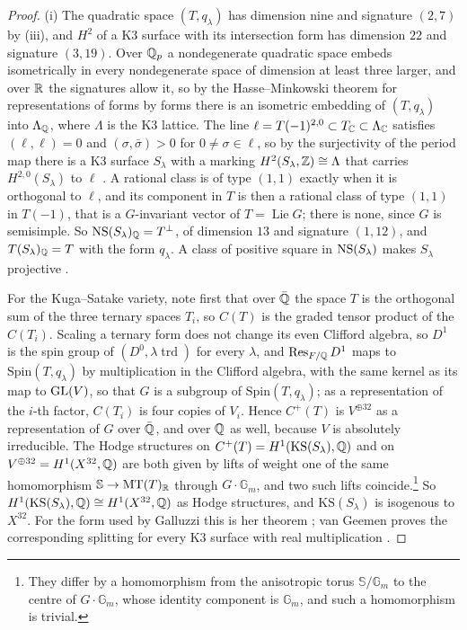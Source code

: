 \begin{proof}
(i) The quadratic space $(T,q_{\lambda})$ has dimension nine and signature
$(2,7)$ by (iii), and $H^{2}$ of a K3 surface with its
intersection form has dimension $22$ and signature $(3,19)$. Over $\mathbb{Q}_{p}$
a nondegenerate quadratic space embeds isometrically in every nondegenerate
space of dimension at least three larger, and over $\mathbb{R}$ the signatures
allow it, so by the Hasse--Minkowski theorem for representations of forms by
forms \cite[\S\S63, 66]{OMe00} there is an isometric embedding of
$(T,q_{\lambda})$ into $\Lambda_{\mathbb{Q}}$, where $\Lambda$ is the K3 lattice.
The line $\ell=T(-1)^{2,0}\subset T_{\mathbb{C}}\subset\Lambda_{\mathbb{C}}$ satisfies
$(\ell,\ell)=0$ and $(\sigma,\bar{\sigma})>0$ for $0\ne\sigma\in\ell$, so by the
surjectivity of the period map there is a K3 surface $S_{\lambda}$ with a
marking $H^{2}(S_{\lambda},\mathbb{Z})\cong\Lambda$ that carries
$H^{2,0}(S_{\lambda})$ to $\ell$ \cite[Chs.~6--7]{Huy16}. A rational class
is of type $(1,1)$ exactly when it is orthogonal to $\ell$, and its component
in $T$ is then a rational class of type $(1,1)$ in $T(-1)$, that is a
$G$-invariant vector of $T=\operatorname{Lie}G$; there is none, since $G$ is
semisimple. So $\mathrm{NS}(S_{\lambda})_{\mathbb{Q}}=T^{\perp}$, of dimension $13$ and
signature $(1,12)$, and $T(S_{\lambda})_{\mathbb{Q}}=T$ with the form $q_{\lambda}$.
A class of positive square in $\mathrm{NS}(S_{\lambda})$ makes $S_{\lambda}$
projective \cite[Ch.~8]{Huy16}.

For the Kuga--Satake variety, note first that over $\bar{\mathbb{Q}}$ the space $T$
is the orthogonal sum of the three ternary spaces $T_{i}$, so $C(T)$ is the
graded tensor product of the $C(T_{i})$. Scaling a ternary form does not
change its even Clifford algebra, so $D^{1}$ is the spin group of
$(D^{0},\lambda\operatorname{trd})$ for every $\lambda$, and
$\operatorname{Res}_{F/\mathbb{Q}}D^{1}$ maps to $\mathrm{Spin}(T,q_{\lambda})$ by multiplication
in the Clifford algebra, with the same kernel as its map to $\operatorname{GL}(V)$, so that
$G$ is a subgroup of $\mathrm{Spin}(T,q_{\lambda})$; as a representation of
the $i$-th factor, $C(T_{i})$ is four copies of $V_{i}$. Hence $C^{+}(T)$ is
$V^{\oplus32}$ as a representation of $G$ over $\bar{\mathbb{Q}}$, and over $\mathbb{Q}$ as
well, because $V$ is absolutely irreducible. The Hodge structures on
$C^{+}(T)=H^{1}(\mathrm{KS}(S_{\lambda}),\mathbb{Q})$ and on
$V^{\oplus32}=H^{1}(X^{32},\mathbb{Q})$ are both given by lifts of weight one of the
same homomorphism $\mathbb{S}\to\operatorname{MT}(T)_{\mathbb{R}}$ through $G\cdot\mathbb{G}_{m}$,
and two such lifts coincide.\footnote{They differ by a homomorphism from the
anisotropic torus $\mathbb{S}/\mathbb{G}_{m}$ to the centre of
$G\cdot\mathbb{G}_{m}$, whose identity component is $\mathbb{G}_{m}$, and
such a homomorphism is trivial.} So
$H^{1}(\mathrm{KS}(S_{\lambda}),\mathbb{Q})\cong H^{1}(X^{32},\mathbb{Q})$ as Hodge
structures, and $\mathrm{KS}(S_{\lambda})$ is isogenous to $X^{32}$. For the
form used by Galluzzi this is her theorem \cite{Gal00}; van Geemen proves the
corresponding splitting for every K3 surface with real multiplication
\cite{vG08}.


\end{proof}
